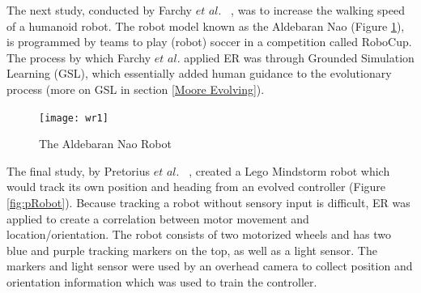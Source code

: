 \documentclass{sig-alternate}
\begin{document}
	
	The next study, conducted by Farchy $et$ $al.$ ~\cite{Farchy:2013:HRL:2484920.2484930}, was to increase the walking speed of a humanoid robot. The robot model known as the Aldebaran Nao (Figure \ref{fig:wRobot}), is programmed by teams to play (robot) soccer in a competition called RoboCup. The process by which  Farchy $et$ $al.$ applied ER was through Grounded Simulation Learning (GSL), which essentially added human guidance to the evolutionary process (more on GSL in section \ref{Moore Evolving}). 
	
\begin{figure}%
\begin{center}
  \texttt{[image: wr1]}
\end{center}
\caption{The Aldebaran Nao Robot}
\label{fig:wRobot}
\end{figure}

	The final study, by Pretorius $et$ $al.$ ~\cite{Pretorius:2009:TAN:1632149.1632171}, created a Lego Mindstorm robot which would track its own position and heading from an evolved controller (Figure \ref{fig:pRobot}). Because tracking a robot without sensory input is difficult, ER was applied to create a correlation between motor movement and location/orientation. The robot consists of two motorized wheels and has two blue and purple tracking markers on the top, as well as a light sensor. The markers and light sensor were used by an overhead camera to collect position and orientation information which was used to train the controller.
\end{document}

